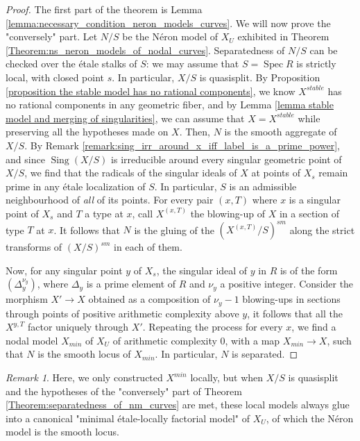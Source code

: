 \documentclass[a4paper,12pt]{amsart} %
\numberwithin{equation}{subsection}
\def\Sing{\operatorname{Sing}}
\newcommand{\Spec}{\operatorname{Spec}}
\theoremstyle{definition}
\theoremstyle{plain}%
\theoremstyle{remark}
\newtheorem{remark}[definition]{Remark}
\begin{document}
\begin{proof}
The first part of the theorem is Lemma \ref{lemma:necessary_condition_neron_models_curves}. We will now prove the "conversely" part. Let $N/S$ be the N\'eron model of $X_U$ exhibited in Theorem \ref{Theorem:ns_neron_models_of_nodal_curves}. Separatedness of $N/S$ can be checked over the \'etale stalks of $S$: we may assume that $S=\Spec R$ is strictly local, with closed point $s$. In particular, $X/S$ is quasisplit. By Proposition \ref{proposition the stable model has no rational components}, we know $X^{stable}$ has no rational components in any geometric fiber, and by Lemma \ref{lemma stable model and merging of singularities}, we can assume that $X=X^{stable}$ while preserving all the hypotheses made on $X$. Then, $N$ is the smooth aggregate of $X/S$. By Remark \ref{remark:sing_irr_around_x_iff_label_is_a_prime_power}, and since $\Sing(X/S)$ is irreducible around every singular geometric point of $X/S$, we find that the radicals of the singular ideals of $X$ at points of $X_s$ remain prime in any étale localization of $S$. In particular, $S$ is an admissible neighbourhood of \emph{all} of its points. For every pair $(x,T)$ where $x$ is a singular point of $X_s$ and $T$ a type at $x$, call $X^{(x,T)}$ the blowing-up of $X$ in a section of type $T$ at $x$. It follows that $N$ is the gluing of the $(X^{(x,T)}/S)^{sm}$ along the strict transforms of $(X/S)^{sm}$ in each of them.

Now, for any singular point $y$ of $X_s$, the singular ideal of $y$ in $R$ is of the form $(\Delta_y^{\nu_y})$, where $\Delta_y$ is a prime element of $R$ and $\nu_y$ a positive integer. Consider the morphism $X'\to X$ obtained as a composition of $\nu_y-1$ blowing-ups in sections through points of positive arithmetic complexity above $y$, it follows that all the $X^{y,T}$ factor uniquely through $X'$. Repeating the process for every $x$, we find a nodal model $X_{min}$ of $X_U$ of arithmetic complexity $0$, with a map $X_{min}\to X$, such that $N$ is the smooth locus of $X_{min}$. In particular, $N$ is separated.
\end{proof}

\begin{remark}
Here, we only constructed $X^{min}$ locally, but when $X/S$ is quasisplit and the hypotheses of the "conversely" part of Theorem \ref{Theorem:separatedness_of_nm_curves} are met, these local models always glue into a canonical "minimal \'etale-locally factorial model" of $X_U$, of which the N\'eron model is the smooth locus.
\end{remark}


\end{document}

